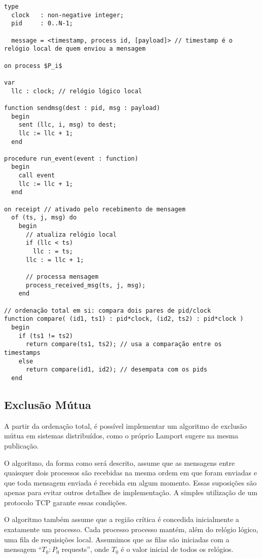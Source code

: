 \begin{lstlisting}[caption={Ordenação total no processo $P_i$}, emph={[2]i,j}, emphstyle={[2]\emph}, mathescape=true, label=totalorder]
type
  clock   : non-negative integer;
  pid     : 0..N-1;

  message = <timestamp, process id, [payload]> // timestamp é o relógio local de quem enviou a mensagem

on process $P_i$

var
  llc : clock; // relógio lógico local

function sendmsg(dest : pid, msg : payload)
  begin
    sent (llc, i, msg) to dest;
    llc := llc + 1;
  end

procedure run_event(event : function)
  begin
    call event
    llc := llc + 1;
  end

on receipt // ativado pelo recebimento de mensagem
  of (ts, j, msg) do
    begin
      // atualiza relógio local
      if (llc < ts)
        llc : = ts;
      llc : = llc + 1;

      // processa mensagem
      process_received_msg(ts, j, msg);
    end

// ordenação total em si: compara dois pares de pid/clock
function compare( (id1, ts1) : pid*clock, (id2, ts2) : pid*clock )
  begin
    if (ts1 != ts2)
      return compare(ts1, ts2); // usa a comparação entre os timestamps
    else
      return compare(id1, id2); // desempata com os pids
  end
\end{lstlisting}

\subsection{Exclusão Mútua}

A partir da ordenação total, é possível implementar um algoritmo de
exclusão mútua em sistemas distribuídos, como o próprio Lamport sugere
na mesma publicação.

O algoritmo, da forma como será descrito, assume que as mensagens entre
quaisquer dois processos são recebidas na mesma ordem em que foram
enviadas e que toda mensagem enviada é recebida em algum momento. Essas
suposições são apenas para evitar outros detalhes de implementação. A
simples utilização de um protocolo TCP garante essas condições.

O algoritmo também assume que a região crítica é concedida inicialmente
a exatamente um processo. Cada processo processo mantém, além do relógio
lógico, uma fila de requisições local. Assumimos que as filas são iniciadas
com a mensagem ``$T_0:P_0$ requests'', onde $T_0$ é o valor inicial de
todos os relógios.

